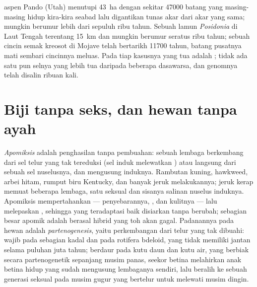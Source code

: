 \begin{example}\label{ex:b2:asexual-reproduction:oldest}
 aspen Pando (Utah) menutupi \qty{43}{ha} dengan sekitar
\num{47000} batang yang masing-masing hidup kira-kira seabad lalu
digantikan tunas akar dari akar yang sama;  mungkin berumur
lebih dari sepuluh ribu tahun. Sebuah  lamun \emph{Posidonia} di
Laut Tengah terentang \qty{15}{km} dan mungkin berumur seratus ribu
tahun; sebuah cincin semak kreosot di Mojave telah bertarikh
\num{11700} tahun, batang pusatnya mati sembari cincinnya meluas. Pada
tiap kasusnya yang tua adalah ; tidak ada satu pun selnya yang
lebih tua daripada beberapa dasawarsa, dan genomnya telah disalin
ribuan kali.
\end{example}

\section{Biji tanpa seks, dan hewan tanpa ayah}

\begin{definition}[Apomiksis]\label{def:b2:asexual-reproduction:apomixis}
\emph{Apomiksis} adalah penghasilan  tanpa pembuahan: sebuah
lembaga berkembang dari sel telur yang tak tereduksi (sel induk
 melewatkan ) atau langsung dari sebuah sel
nuselusnya, dan  mengusung  induknya. Rambutan kuning,
hawkweed, arbei hitam, rumput biru Kentucky, dan banyak jeruk
melakukannya;  jeruk kerap memuat beberapa lembaga, satu seksual
dan sisanya salinan nuselus induknya. Apomiksis mempertahankan 
--- penyebarannya, , dan kulitnya --- lalu melepaskan
, sehingga  yang teradaptasi baik disiarkan tanpa
berubah; sebagian besar apomik adalah  berasal hibrid yang
 toh akan gagal. Padanannya pada hewan adalah
\emph{partenogenesis}, yaitu perkembangan dari telur yang tak dibuahi:
wajib pada sebagian kadal dan pada rotifera bdeloid, yang tidak
memiliki jantan selama puluhan juta tahun; berdaur pada kutu daun dan
kutu air, yang berbiak secara partenogenetik sepanjang musim panas,
seekor betina melahirkan anak betina hidup yang sudah mengusung
lembaganya sendiri, lalu beralih ke sebuah generasi seksual pada musim
gugur yang bertelur untuk melewati musim dingin.
\end{definition}


